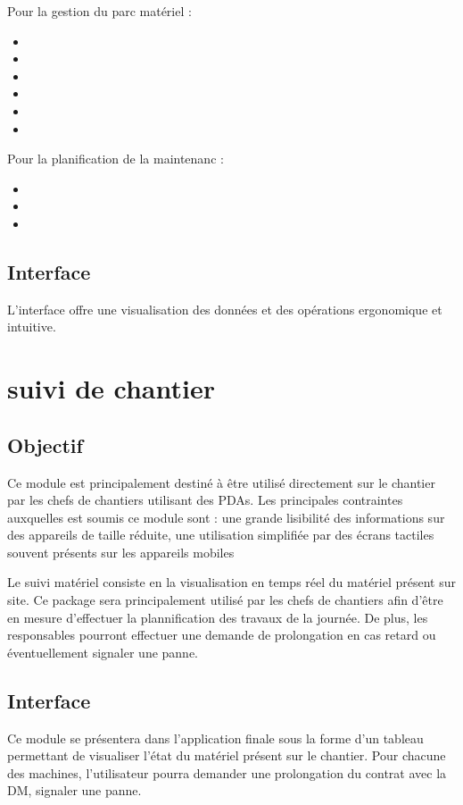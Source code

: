         Pour la gestion du parc matériel :
               \begin{itemize}
	               \item 
	               \item 
	               \item 
	               \item 
	               \item 
	               \item 
               \end{itemize}

        Pour la planification de la maintenanc :
               \begin{itemize}
	               \item 
	               \item 
	               \item 
               \end{itemize}


	\subsection{Interface}
	L'interface offre une visualisation des données et des opérations ergonomique et intuitive.\\ 

\section {suivi de chantier}
	\subsection {Objectif}
	Ce module est principalement destiné à être utilisé directement sur le chantier par les chefs de chantiers utilisant des PDAs.
Les principales contraintes auxquelles est soumis ce module sont : 
une grande lisibilité des informations sur des appareils de taille réduite, une utilisation simplifiée par des écrans tactiles souvent présents sur les appareils mobiles

        Le suivi matériel consiste en la visualisation en temps réel du matériel présent sur site. 
	Ce package sera principalement utilisé par les chefs de chantiers afin d'être en mesure d'effectuer la plannification des travaux de la journée.
	De plus, les responsables pourront effectuer une demande de prolongation en cas retard ou éventuellement signaler une panne.

	\subsection {Interface}
	Ce module se présentera dans l'application finale sous la forme d'un tableau permettant de visualiser l'état du matériel présent sur le chantier. 
	Pour chacune des machines, l'utilisateur pourra demander une prolongation du contrat avec la DM, signaler une panne.

